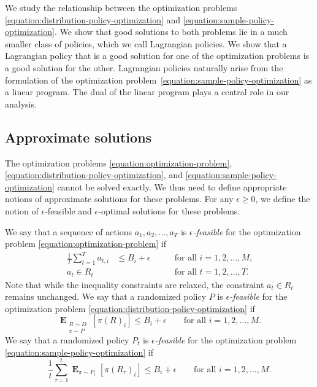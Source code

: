 \documentclass[12pt]{article}
\DeclareMathOperator*{\Exp}{\mathbf{E}}
\theoremstyle{definition}
\begin{document}
We study the relationship between the optimization problems
\eqref{equation:distribution-policy-optimization} and
\eqref{equation:sample-policy-optimization}. We show that good solutions to both
problems lie in a much smaller class of policies, which we call Lagrangian
policies. We show that a Lagrangian policy that is a good solution for one of
the optimization problems is a good solution for the other. Lagrangian policies
naturally arise from the formulation of the optimization
problem~\eqref{equation:sample-policy-optimization} as a linear program. The
dual of the linear program plays a central role in our analysis.

\subsection{Approximate solutions}

The optimization problems \eqref{equation:optimization-problem},
\eqref{equation:distribution-policy-optimization}, and
\eqref{equation:sample-policy-optimization} cannot be solved exactly. We thus
need to define appropriate notions of approximate solutions for these problems.
For any $\epsilon \ge 0$, we define the notion of $\epsilon$-feasible and
$\epsilon$-optimal solutions for these problems.

We say that a sequence of actions $a_1, a_2, \dots, a_T$ is
\emph{$\epsilon$-feasible} for the optimization problem
\eqref{equation:optimization-problem} if
\begin{align*}
\frac{1}{T} \sum_{t=1}^T a_{t,i} & \le B_i + \epsilon & \qquad \text{for all $i=1,2,\dots,M$,} \\
a_t \in R_t && \qquad \text{for all $t=1,2,\dots,T$.}
\end{align*}
Note that while the inequality constraints are relaxed, the constraint $a_t \in
R_t$ remains unchanged. We say that a randomized policy $P$ is
\emph{$\epsilon$-feasible} for the optimization problem
\eqref{equation:distribution-policy-optimization} if
$$
\Exp_{\substack{R \sim D \\ \pi \sim P}} \left[ \pi(R)_i \right] \le B_i + \epsilon \qquad \text{for all $i=1,2,\dots,M$.}
$$
We say that a randomized policy $P_t$ is \emph{$\epsilon$-feasible}
for the optimization problem \eqref{equation:sample-policy-optimization} if
$$
\frac{1}{t} \sum_{\tau=1}^t \Exp_{\pi \sim P_t} \left[ \pi(R_\tau)_i \right] \le B_i + \epsilon \qquad \text{for all $i=1,2,\dots,M$.}
$$
\end{document}
